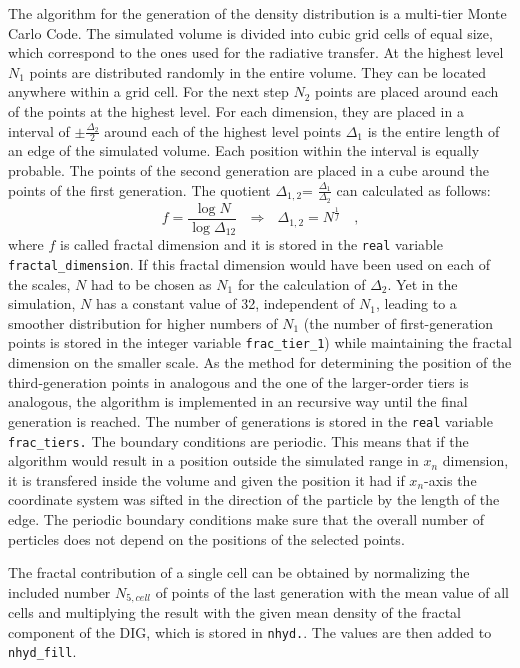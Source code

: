 \documentclass[a4paper,10pt]{article}
\begin{document}
The algorithm for the generation of the density distribution is a multi-tier 
Monte Carlo Code. The simulated volume is divided into cubic grid  cells of 
equal size, which correspond to the ones used for the radiative transfer.
At the highest level \(N_1\) points are distributed randomly in the 
entire volume. They can be located anywhere within a grid cell. For the next 
step \(N_2\) points are placed around each of the points at the highest level. 
For each dimension, they are placed in a interval of \(\pm \frac{\Delta_2}{2}\) 
around each of the highest level points \(\Delta_1\) is the entire length of an 
edge of the simulated volume. Each position within the interval is equally 
probable. The points of the second generation are placed  in a cube around the 
points of the first generation. 
The quotient \(\Delta_{1,2}\)= \(\frac{\Delta_1}{\Delta_2}\) can calculated as 
follows:
\begin{equation}
 f= \frac{\log N}{\log \Delta_{1 2}}~~~\Longrightarrow ~~~ \Delta_{1,2} = 
N^{\frac{1}{f}}\mbox{~~~,}
\end{equation}
where \(f\) is called fractal dimension and it is stored in the \texttt{real} 
variable \texttt{fractal\_dimension}.  If this fractal dimension would have 
been used on each of the scales, \(N\) had to be chosen as \(N_1\) for the 
calculation of \(\Delta_2\). Yet in the simulation, \(N\) has a constant value 
of 32, independent of \(N_1\), leading to a smoother distribution for higher 
numbers of \(N_1\) (the number of first-generation points is stored in the 
integer variable \texttt{frac\_tier\_1}) while maintaining the fractal 
dimension on the smaller scale. As the method for determining the position of 
the third-generation points in analogous and the one of the larger-order tiers 
is analogous, the algorithm is implemented in an recursive way until the final 
generation is reached.  
The number of generations is stored in the \texttt{real} variable 
\texttt{frac\_tiers.}
The boundary conditions are periodic. This means that if the algorithm would 
result in a position outside the simulated range in \(x_n\) dimension, it is 
transfered inside the volume and given the position it  had if \(x_n\)-axis the 
coordinate system was sifted in the direction of the particle by the length of 
the edge. The periodic boundary conditions make sure that the overall number of 
perticles does not depend on the positions of the selected points.  

The fractal contribution of a single cell can be obtained by normalizing the 
included number \(N_{5,cell}\)  of points of the last 
generation with the mean value of all cells and multiplying the result with the 
given mean density of the fractal component of the DIG, which is stored in 
\texttt{nhyd.}. The values are then added to \texttt{nhyd\_fill}.
\end{document}
